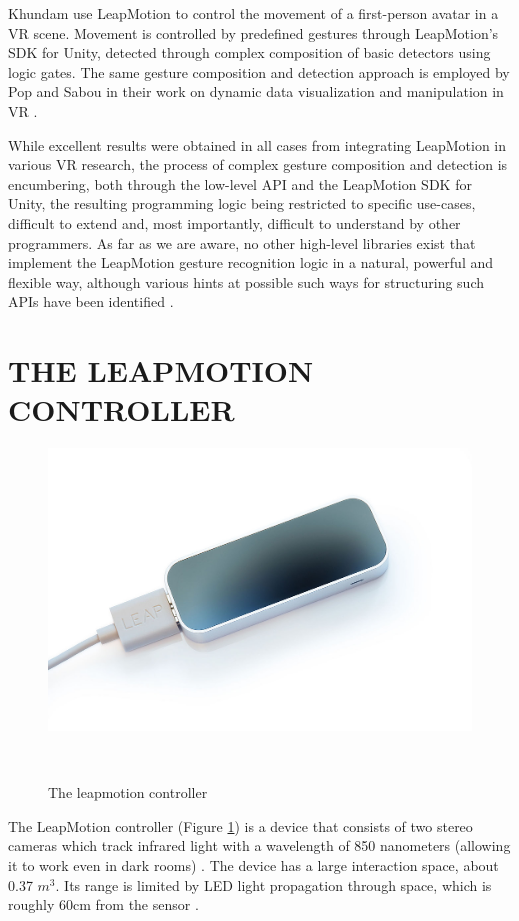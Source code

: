 \documentclass{sigchi}
\def\leap{LeapMotion}
\begin{document}
Khundam \cite{Khundam} use \leap{} to control the movement of a first-person avatar in a VR scene. Movement is controlled by predefined gestures through \leap{}'s SDK for Unity, detected through complex composition of basic detectors using logic gates. The same gesture composition and detection approach is employed by Pop and Sabou in their work on dynamic data visualization and manipulation in VR \cite{Pop}.

While excellent results were obtained in all cases from integrating \leap{} in various VR research, the process of complex gesture composition and detection is encumbering, both through the low-level API and the \leap{} SDK for Unity, the resulting programming logic being restricted to specific use-cases, difficult to extend and, most importantly, difficult to understand by other programmers. As far as we are aware, no other high-level libraries exist that implement the \leap{} gesture recognition logic in a natural, powerful and flexible way, although various hints at possible such ways for structuring such APIs have been identified \cite{zuhlke}.

\section{THE LEAPMOTION CONTROLLER}

\begin{figure}[b]
\centering
  \includegraphics[width=0.7\columnwidth]{figures/LeapMotion_controller}
  \caption{The leapmotion controller}~\label{fig:figure1}
\end{figure}

The \leap{} controller (Figure \ref{fig:figure1}) is a device that consists of two stereo cameras which track infrared light with a wavelength of 850 nanometers (allowing it to work even in dark rooms) \cite{LeapArticle}. The device has a large interaction space, about 0.37 $m^3$. Its range is limited by LED light propagation through space, which is roughly 60cm from the sensor \cite{LeapArticle}.
\end{document}
